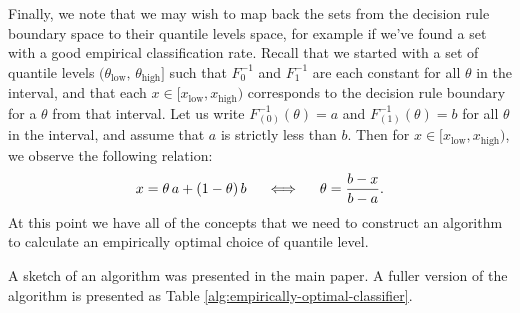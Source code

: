 \documentclass{article}
\begin{document}
Finally, we note that we may wish to map back the sets from the decision rule
boundary space to their quantile levels space, for example if we've found a set
with a good empirical classification rate.  Recall that we started with a set of
quantile levels
$(\theta_{\scriptscriptstyle\text{low}},\,
\theta_{\scriptscriptstyle\text{high}}]$ such that $F_{0}^{-1}$ and $F_{1}^{-1}$
are each constant for all $\theta$ in the interval, and that each
$x \in [x_{\scriptscriptstyle\text{low}}, x_{\scriptscriptstyle\text{high}})$
corresponds to the decision rule boundary for a $\theta$ from that interval.
Let us write $F_{(0)}^{-1}(\theta) = a$ and $F_{(1)}^{-1}(\theta) = b$ for all
$\theta$ in the interval, and assume that $a$ is strictly less than $b$.  Then
for
$x \in [x_{\scriptscriptstyle\text{low}}, x_{\scriptscriptstyle\text{high}})$,
we observe the following relation:
\begin{equation}
  \label{eq:map-to-quantile}
  x = \theta\, a + (1 - \theta)\, b
  \hspace{5mm} \Longleftrightarrow \hspace{5mm}
  \theta = \frac{b - x}{b - a}.
\end{equation}
At this point we have all of the concepts that we need to construct an algorithm
to calculate an empirically optimal choice of quantile level. 






\vspace{30mm}

A sketch of an algorithm was presented in the main paper.  A fuller version of
the algorithm is presented as Table \ref{alg:empirically-optimal-classifier}.
\end{document}
